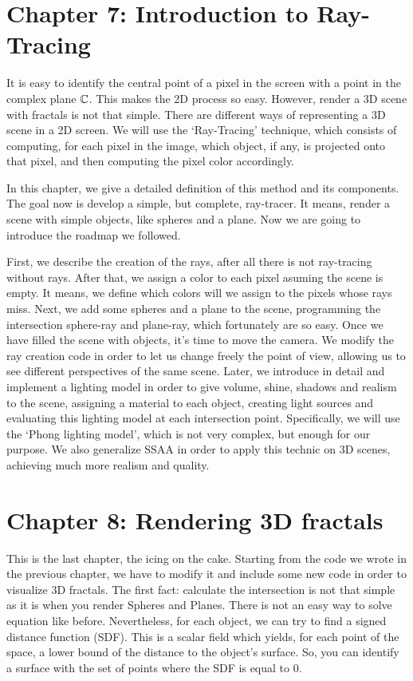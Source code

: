 \section*{Chapter 7: Introduction to Ray-Tracing}

It is easy to identify the central point of a pixel in the screen with a point in the complex plane $\mathbb{C}$. This makes the 2D process so easy. However, render a 3D scene with fractals is not that simple. There are different ways of representing a 3D scene in a 2D screen. We will use the `Ray-Tracing' technique, which consists of computing, for each pixel in the image, which object, if any, is projected onto that pixel, and then computing the pixel color accordingly.

In this chapter, we give a detailed definition of this method and its components. The goal now is develop a simple, but complete, ray-tracer. It means, render a scene with simple objects, like spheres and a plane. Now we are going to introduce the roadmap we followed.

First, we describe the creation of the rays, after all there is not ray-tracing without rays. After that, we assign a color to each pixel asuming the scene is empty. It means, we define which colors will we assign to the pixels whose rays miss. Next, we add some spheres and a plane to the scene, programming the intersection sphere-ray and plane-ray, which fortunately are so easy. Once we have filled the scene with objects, it's time to move the camera. We modify the ray creation code in order to let us change freely the point of view, allowing us to see different perspectives of the same scene. Later, we introduce in detail and implement a lighting model in order to give volume, shine, shadows and realism to the scene, assigning a material to each object, creating light sources and evaluating this lighting model at each intersection point. Specifically, we will use the `Phong lighting model', which is not very complex, but enough for our purpose. We also generalize SSAA in order to apply this technic on 3D scenes, achieving much more realism and quality.

\section*{Chapter 8: Rendering 3D fractals}

This is the last chapter, the icing on the cake. Starting from the code we wrote in the previous chapter, we have to modify it and include some new code in order to visualize 3D fractals. The first fact: calculate the intersection is not that simple as it is when you render Spheres and Planes. There is not an easy way to solve equation like before. Nevertheless, for each object, we can try to find a signed distance function (SDF). This is a scalar field which yields, for each point of the space, a lower bound of the distance to the object's surface. So, you can identify a surface with the set of points where the SDF is equal to 0.

